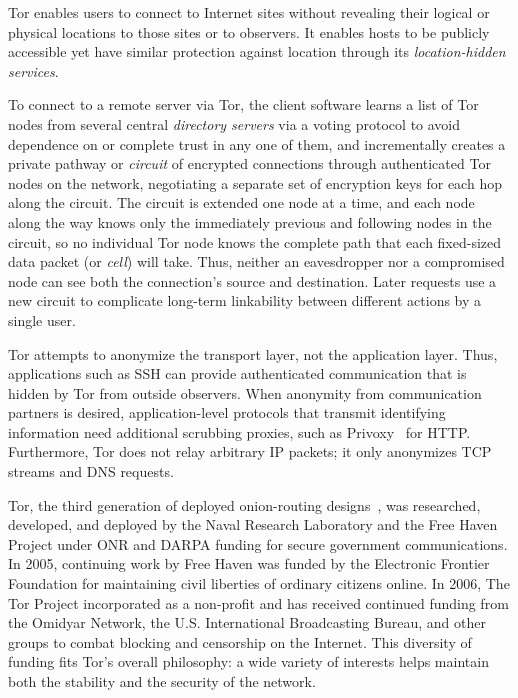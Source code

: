 \documentclass{llncs}
\begin{document}
Tor enables users to connect to Internet sites without revealing their
logical or physical locations to those sites or to observers.  It
enables hosts to be publicly accessible yet have similar protection
against location through its \emph{location-hidden services}.

To connect to a remote server via Tor, the client software learns
a %
list of Tor nodes from several central \emph{directory servers} via a
voting protocol to avoid dependence on or complete trust in any one of
them, and incrementally creates a private pathway or \emph{circuit} of
encrypted connections through authenticated Tor nodes on the network,
negotiating a separate set of encryption keys for each hop along the
circuit.  The circuit is extended one node at a time, and each node
along the way knows only the immediately previous and following nodes
in the circuit, so no individual Tor node knows the complete path that
each fixed-sized data packet (or \emph{cell}) will take.  Thus,
neither an eavesdropper nor a compromised node can see both the
connection's source and destination.  Later requests use a new
circuit to complicate long-term linkability between different actions
by a single user.

Tor attempts to anonymize the transport layer, not the application
layer.  Thus, applications such as SSH can provide
authenticated communication that is hidden by Tor from outside observers.
When anonymity from communication partners is desired,
application-level protocols that transmit identifying
information need additional scrubbing proxies, such as
Privoxy~\cite{privoxy} for HTTP\@.  Furthermore, Tor does not relay
arbitrary IP packets; it only anonymizes TCP streams and DNS requests.

Tor, the third generation of deployed onion-routing
designs~\cite{or-ih96,or-jsac98,tor-design}, was researched, developed,
and deployed by the Naval Research Laboratory and the Free Haven
Project under ONR and DARPA funding for secure government
communications.  In 2005, continuing work by Free Haven was funded by
the Electronic Frontier Foundation for maintaining civil liberties of
ordinary citizens online. In 2006, The Tor Project incorporated as a
non-profit and has received continued funding from the Omidyar Network,
the U.S. International Broadcasting Bureau, and other groups to combat
blocking and censorship on the Internet. This diversity of funding fits
Tor's overall philosophy: a wide variety of interests helps maintain
both the stability and the security of the network.
\end{document}
